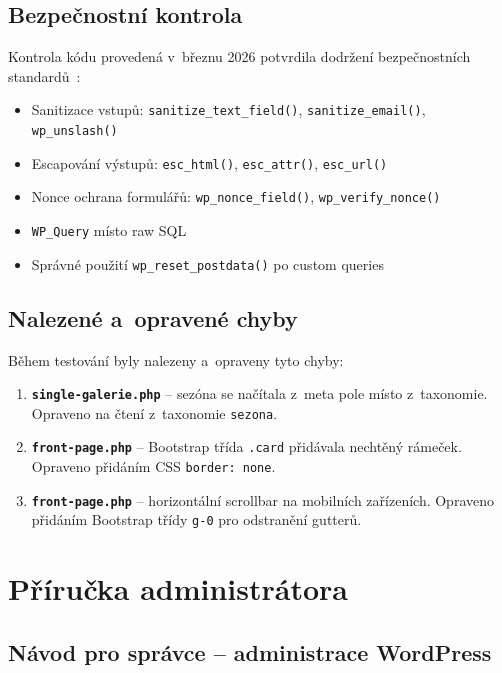 \documentclass[12pt,a4paper]{article}
\begin{document}
\subsection{Bezpečnostní kontrola}

Kontrola kódu provedená v~březnu 2026 potvrdila dodržení bezpečnostních standardů~\cite{themehandbook}:

\begin{itemize}
    \item Sanitizace vstupů: \texttt{sanitize\_text\_field()}, \texttt{sanitize\_email()}, \texttt{wp\_unslash()}
    \item Escapování výstupů: \texttt{esc\_html()}, \texttt{esc\_attr()}, \texttt{esc\_url()}
    \item Nonce ochrana formulářů: \texttt{wp\_nonce\_field()}, \texttt{wp\_verify\_nonce()}
    \item \texttt{WP\_Query} místo raw SQL
    \item Správné použití \texttt{wp\_reset\_postdata()} po custom queries
\end{itemize}

\subsection{Nalezené a~opravené chyby}

Během testování byly nalezeny a~opraveny tyto chyby:

\begin{enumerate}
    \item \textbf{\texttt{single-galerie.php}} -- sezóna se načítala z~meta pole místo z~taxonomie. Opraveno na čtení z~taxonomie \texttt{sezona}.
    \item \textbf{\texttt{front-page.php}} -- Bootstrap třída \texttt{.card} přidávala nechtěný rámeček. Opraveno přidáním CSS \texttt{border: none}.
    \item \textbf{\texttt{front-page.php}} -- horizontální scrollbar na mobilních zařízeních. Opraveno přidáním Bootstrap třídy \texttt{g-0} pro odstranění gutterů.
\end{enumerate}

\clearpage
\section{Příručka administrátora}

\subsection{Návod pro správce -- administrace WordPress}
\end{document}
